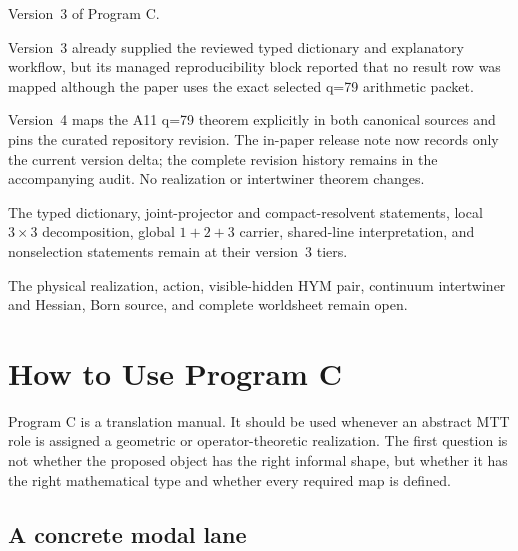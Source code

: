 \documentclass[11pt]{article}
\begin{document}
\begin{description}[leftmargin=2.5cm,style=nextline]
\item[Supersedes.]
Version~3 of Program C.

\item[Reason.]
Version~3 already supplied the reviewed typed dictionary and explanatory
workflow, but its managed reproducibility block reported that no result row
was mapped although the paper uses the exact selected q=79 arithmetic packet.

\item[Resolution.]
Version~4 maps the A11 q=79 theorem explicitly in both canonical sources and
pins the curated repository revision.  The in-paper release note now records
only the current version delta; the complete revision history remains in the
accompanying audit.  No realization or intertwiner theorem changes.

\item[Retained content.]
The typed dictionary, joint-projector and compact-resolvent statements, local
$3\times3$ decomposition, global $1+2+3$ carrier, shared-line interpretation,
and nonselection statements remain at their version~3 tiers.

\item[Open boundary.]
The physical realization, action, visible-hidden HYM pair, continuum
intertwiner and Hessian, Born source, and complete worldsheet remain open.
\end{description}

\begingroup
\scriptsize
\setlength{\parskip}{0pt}
\tableofcontents
\endgroup
\newpage

\section{How to Use Program C}

Program C is a translation manual.  It should be used whenever an abstract MTT
role is assigned a geometric or operator-theoretic realization.  The first
question is not whether the proposed object has the right informal shape, but
whether it has the right mathematical type and whether every required map is
defined.

\subsection{A concrete modal lane}
\end{document}
